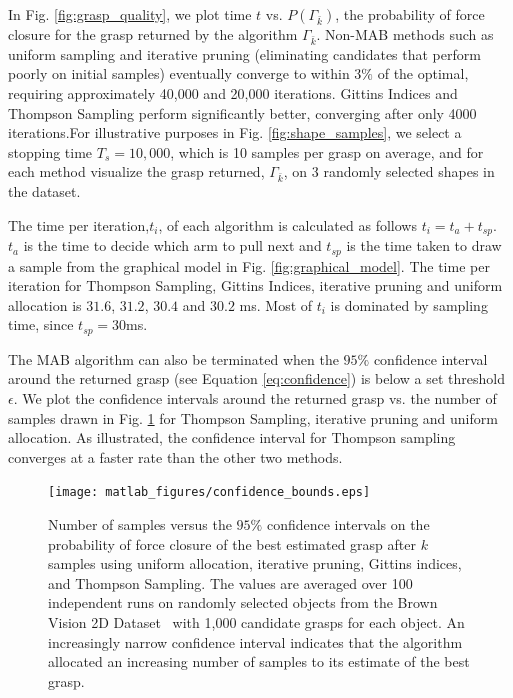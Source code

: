 \documentclass[10pt, conference]{ieeeconf}      %
\begin{document}
In Fig. \ref{fig:grasp_quality}, we plot time $t$ vs. $P(\Gamma_{\bar{k}})$, the probability of force closure for the grasp returned by the algorithm $\Gamma_{\bar{k}}$.  Non-MAB methods such as uniform sampling and iterative pruning (eliminating candidates that perform poorly on initial samples) eventually converge to within 3$\%$ of the optimal, requiring approximately 40,000 and 20,000 iterations.  Gittins Indices and Thompson Sampling  perform significantly better, converging after only 4000 iterations.For illustrative purposes in Fig. \ref{fig:shape_samples}, we select a stopping time $T_s=10,000$, which is 10 samples per grasp on average, and for each method visualize the grasp  returned, $\Gamma_{\bar{k}}$, on 3 randomly selected shapes in the dataset.

The time per iteration,$t_{i}$, of each algorithm is calculated as follows $t_{i} = t_{a}+t_{sp}$. $t_{a}$ is the time to decide which arm to pull next and $t_{sp}$ is the time taken to draw a sample from the graphical model in Fig. \ref{fig:graphical_model}. The time per iteration for Thompson Sampling, Gittins Indices, iterative pruning and uniform allocation is $31.6$, $31.2$, $30.4$ and $30.2$ ms. Most of $t_{i}$ is dominated by sampling time, since $t_{sp} = 30$ms.

The MAB algorithm can also be terminated when the $95\%$ confidence interval around the returned grasp (see Equation \ref{eq:confidence}) is below a set threshold $\epsilon$. We plot the confidence intervals around the returned grasp vs. the number of samples drawn in Fig. \ref{fig:confidence} for Thompson Sampling, iterative pruning\cite{kehoe2012toward} and uniform allocation.  As illustrated, the confidence interval for Thompson sampling converges at a faster rate than the other two methods. 


\begin{figure}[t!]
\centering
\texttt{[image: matlab\_figures/confidence\_bounds.eps]}
\caption{ Number of samples versus the $95\%$ confidence intervals on the probability of force closure of the best estimated grasp after $k$ samples using uniform allocation, iterative pruning, Gittins indices, and Thompson Sampling. The values are averaged over 100 independent runs on randomly selected objects from the Brown Vision 2D Dataset~\cite{brown} with 1,000 candidate grasps for each object. An increasingly narrow confidence interval indicates that the algorithm allocated an increasing number of samples to its estimate of the best grasp. }

\vspace*{-10pt}
\label{fig:confidence}
\end{figure}
\end{document}
